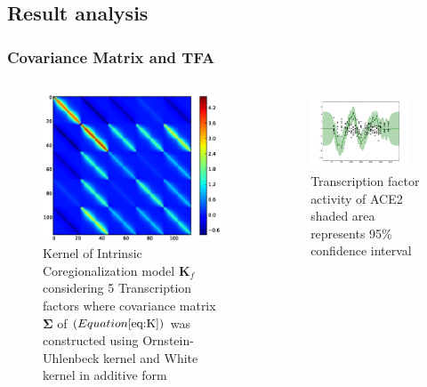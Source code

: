 \documentclass{beamer}
\begin{document}
\subsection{Result analysis}
\begin{frame}
\frametitle{Covariance Matrix and TFA}
\begin{columns}[c] 
\begin{figure}[t]
	\centering
		\includegraphics[width=.8\textwidth,keepaspectratio]{diagrams/kern_6TF.eps}
	\caption[Kernel of Intrinsic Coregionalization model $\textbf{K}_f$ considering 5 
		 Transcription factors where covariance matrix $\boldsymbol{\Sigma}$
		 was constructed using Ornstein-Uhlenbeck kernel and White kernel in additive form]
		{Kernel of Intrinsic Coregionalization model $\textbf{K}_f$ considering 5 
		 Transcription factors where covariance matrix $\boldsymbol{\Sigma}$ 
		 of $\left( Equation \ref{eq:K} \right)$ was constructed 
		 using Ornstein-Uhlenbeck kernel and White kernel in additive form}
	\label{fig:kern_6TF}
\end{figure}
\begin{figure}[]
	\centering
		\includegraphics[width=0.9\textwidth,keepaspectratio]{diagrams/ACE2_OU_Wh_9TF.png}
	\caption[Transcription factor activity of ACE2]
		{Transcription factor activity of ACE2 shaded area represents 95\% confidence interval}
	\label{fig:TFA_of_of_ACE2}
\end{figure}


\end{columns}
\end{frame}
\end{document}
